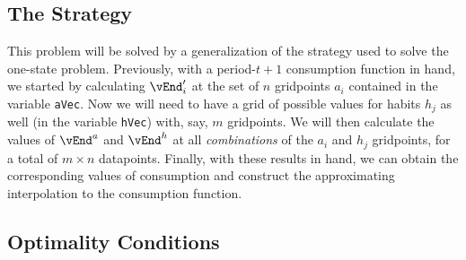 \documentclass[titlepage, headings=optiontotocandhead]{\econtex}
\begin{document}
{  \hypertarget{The-Strategy}{}
  \subsection{The Strategy}

  This problem will be solved by a generalization of the strategy used
  to solve the one-state problem.  Previously, with a period-$t+1$
  consumption function in hand, we started by calculating
  $\vEnd^{\prime}_{i}$ at the set of $n$ gridpoints ${a}_{i}$
  contained in the variable \texttt{aVec}.  Now we will need to
  have a grid of possible values for habits $h_{j}$ as well (in the
  variable \texttt{hVec}) with, say, $m$ gridpoints.  We will then
  calculate the values of $\vEnd^{{a}}$ and $\vEnd^{h}$
  at all \textit{combinations} of the ${a}_{i}$ and $h_{j}$
  gridpoints, for a total of $m \times n$ datapoints.  Finally, with
  these results in hand, we can obtain the corresponding values of
  consumption and construct the approximating interpolation to the
  consumption function.

  \hypertarget{Optimality-Conditions}{}
  \subsection{Optimality Conditions}
  \hypertarget{The-First-Orrder-Condition-for-c}{}
}
\end{document}
